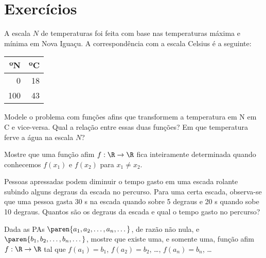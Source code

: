 \section{Exercícios}

\begin{exercise}
A escala $N$ de temperaturas foi feita com base nas temperaturas máxima e mínima em Nova Iguaçu. 
A correspondência com a escala Celsius é a seguinte:
%
\begin{center}
\begin{tabular}{|r|r|}
  \hline
  ºN & ºC \\ \hline
  0 & 18 \\ \hline
  100 & 43 \\ \hline
\end{tabular}
\end{center}
Modele o problema com funções afins que transformem a temperatura em
\tdeg N em \tdeg C e vice-versa. Qual a relação entre essas duas funções? Em
que temperatura ferve a água na escala $N$?
\end{exercise}

\begin{exercise}
Mostre que uma função afim $f: \R \to \R$ fica inteiramente
determinada quando conhecemos $f(x_1)$ e $f(x_2)$ para $x_1 \neq
x_2$.
\end{exercise}

\begin{exercise}
Pessoas apressadas podem diminuir o tempo gasto em uma escada
rolante subindo alguns degraus da escada no percurso. Para uma certa
escada, observa-se que uma pessoa gasta 30 s na escada quando
sobre 5 degraus e 20 s quando sobe 10 degraus. Quantos são os
degraus da escada e qual o tempo gasto no percurso?
\end{exercise}

\begin{exercise}
    Dada as PAs $\paren{a_1, a_2, \dots, a_n, \dots}$, de razão não
nula, e $\paren{b_1, b_2, \dots, b_n, \dots}$, mostre que existe
uma, e somente uma, função afim $f: \R \to \R$ tal que $f(a_1) =
b_1$, $f(a_2) = b_2$, \dots , $f(a_n) = b_n$, \dots
\end{exercise}


